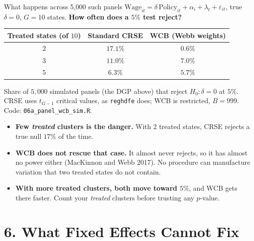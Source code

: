 \documentclass[
  11pt,
  ignorenonframetext,
  aspectratio=169,
]{beamer}
\providecommand{\tightlist}{%
  \setlength{\itemsep}{0pt}\setlength{\parskip}{0pt}}
\begin{document}
\begin{frame}{What happens across 5,000 such panels}
\protect{}\label{what-happens-across-5000-such-panels}
\(\text{Wage}_{it} = \delta\,\text{Policy}_{it} + \alpha_i + \lambda_t + \varepsilon_{it}\),
true \(\delta = 0\), \(G = 10\) states. \textbf{How often does a \(5\%\)
test reject?}

\begin{center}\small
\begin{tabular}{ccc}
\toprule
Treated states (of $10$) & Standard CRSE & WCB (Webb weights) \\
\midrule
$2$ & $17.1\%$ & $0.6\%$ \\
$3$ & $11.0\%$ & $7.0\%$ \\
$5$ & $6.3\%$ & $5.7\%$ \\
\bottomrule
\end{tabular}
\end{center}

\vspace{-0.2em}
\scriptsize

Share of \(5{,}000\) simulated panels (the DGP above) that reject
\(H_0: \delta = 0\) at \(5\%\). CRSE uses \(t_{G-1}\) critical values,
as \texttt{reghdfe} does; WCB is restricted, \(B = 999\). Code:
\texttt{06a\_panel\_wcb\_sim.R}. \normalsize

\begin{itemize}
\tightlist
\item
  \textbf{Few \emph{treated} clusters is the danger.} With \(2\) treated
  states, CRSE rejects a true null \(17\%\) of the time.
\item
  \textbf{WCB does not rescue that case.} It almost never rejects, so it
  has almost no power either (MacKinnon and Webb 2017). No procedure can
  manufacture variation that two treated states do not contain.
\item
  \textbf{With more treated clusters, both move toward \(5\%\)}, and WCB
  gets there faster. Count your \emph{treated} clusters before trusting
  any \(p\)-value.
\end{itemize}
\end{frame}

\section{6. What Fixed Effects Cannot
Fix}\label{what-fixed-effects-cannot-fix}
\end{document}
